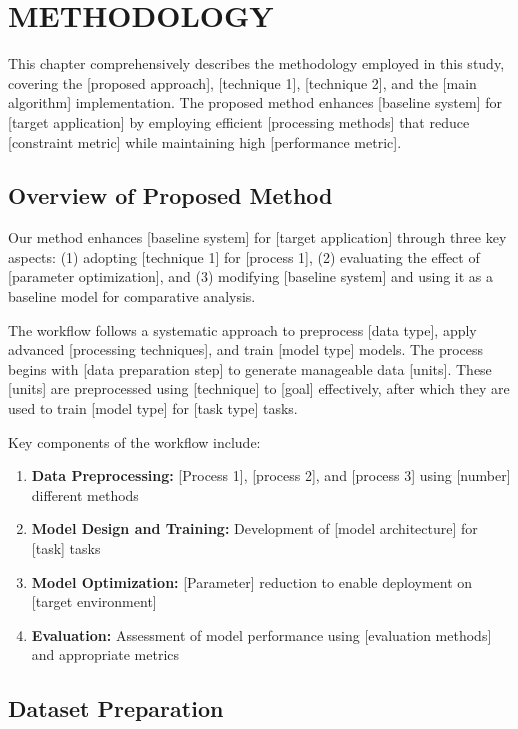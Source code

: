 \chapter{METHODOLOGY}

This chapter comprehensively describes the methodology employed in this study, covering the [proposed approach], [technique 1], [technique 2], and the [main algorithm] implementation. The proposed method enhances [baseline system] for [target application] by employing efficient [processing methods] that reduce [constraint metric] while maintaining high [performance metric].

\section{Overview of Proposed Method}

Our method enhances [baseline system] for [target application] through three key aspects: (1) adopting [technique 1] for [process 1], (2) evaluating the effect of [parameter optimization], and (3) modifying [baseline system] and using it as a baseline model for comparative analysis.

The workflow follows a systematic approach to preprocess [data type], apply advanced [processing techniques], and train [model type] models. The process begins with [data preparation step] to generate manageable data [units]. These [units] are preprocessed using [technique] to [goal] effectively, after which they are used to train [model type] for [task type] tasks.

Key components of the workflow include:

\begin{enumerate}
\item \textbf{Data Preprocessing:} [Process 1], [process 2], and [process 3] using [number] different methods
\item \textbf{Model Design and Training:} Development of [model architecture] for [task] tasks
\item \textbf{Model Optimization:} [Parameter] reduction to enable deployment on [target environment]
\item \textbf{Evaluation:} Assessment of model performance using [evaluation methods] and appropriate metrics
\end{enumerate}

\section{Dataset Preparation}

